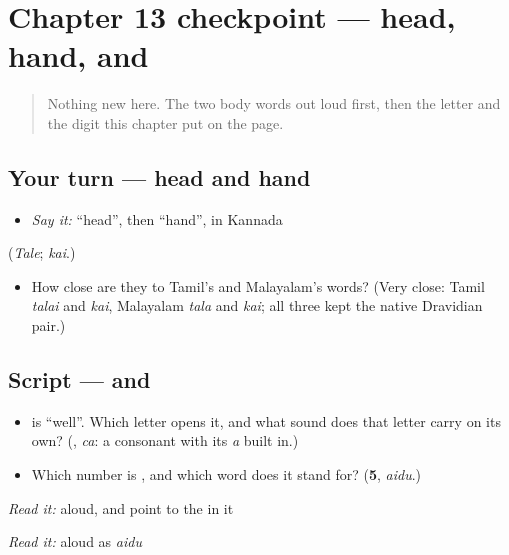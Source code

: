 \section[Practice]{Chapter 13 checkpoint — head, hand,  and }

\label{lesson:KA-C13-checkpoint}



\begin{quote}
Nothing new here. The two body words out loud first, then the letter and the digit this chapter put on the page.
\end{quote}

\subsection*{Your turn — head and hand}
\begin{itemize}
\raggedright
  \item \emph{Say it:} \textquotedblleft{}head\textquotedblright{}, then \textquotedblleft{}hand\textquotedblright{}, in Kannada
\end{itemize}

(\emph{Tale}; \emph{kai}.)

\begin{itemize}
\raggedright
  \item How close are they to Tamil's and Malayalam's words? (Very close: Tamil \emph{talai} and \emph{kai}, Malayalam \emph{tala} and \emph{kai}; all three kept the native Dravidian pair.)
\end{itemize}

\subsection*{Script —  and }
\begin{itemize}
\raggedright
  \item \textbf{} is \textquotedblleft{}well\textquotedblright{}. Which letter opens it, and what sound does that letter carry on its own? (\textbf{}, \emph{ca}: a consonant with its \emph{a} built in.)
  \item Which number is \textbf{}, and which word does it stand for? (\textbf{5}, \emph{aidu}.)
\end{itemize}

\emph{Read it:} \textbf{} aloud, and point to the  in it

\emph{Read it:} \textbf{} aloud as \emph{aidu}

